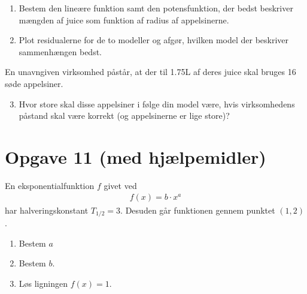 \begin{enumerate}[label=\roman*)]
\item Bestem den lineære funktion samt den potensfunktion, der bedst beskriver mængden af juice som funktion af radius af appelsinerne. 
\item Plot residualerne for de to modeller og afgør, hvilken model der beskriver sammenhængen bedst.
\end{enumerate}
En unavngiven virksomhed påstår, at der til 1.75L af deres juice skal bruges 16 søde appelsiner. 

\begin{enumerate}[label=\roman*)]
\setcounter{enumi}{2}
\item Hvor store skal disse appelsiner i følge din model være, hvis virksomhedens påstand skal være korrekt (og appelsinerne er lige store)?
\end{enumerate}

\section*{Opgave 11 (med hjælpemidler)}
En eksponentialfunktion $f$ givet ved 
\begin{align*}
f(x) = b\cdot x^a
\end{align*}
har halveringskonstant $T_{1/2} = 3$. Desuden går funktionen gennem punktet $(1,2)$. 
\begin{enumerate}[label=\roman*)]
\item Bestem $a$
\item Bestem $b$. 
\item Løs ligningen $f(x) = 1$. 
\end{enumerate}